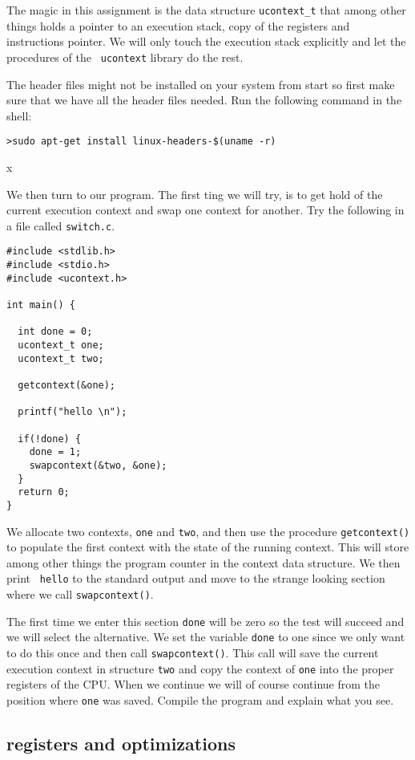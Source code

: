 \documentclass[a4paper,11pt]{article}
\begin{document}
The magic in this assignment is the data structure {\tt ucontext\_t}
that among other things holds a pointer to an execution stack, copy of
the registers and instructions pointer. We will only touch the
execution stack explicitly and let the procedures of the {\tt
  ucontext} library do the rest.

The header files might not be installed on your system from start so
first make sure that we have all the header files needed. Run the
following command in the shell:

\begin {verbatim}
>sudo apt-get install linux-headers-$(uname -r)
\end{verbatim}x

We then turn to our program. The first ting we will try, is to get
hold of the current execution context and swap one context for
another. Try the following in a file called {\tt switch.c}.


\begin{lstlisting}
#include <stdlib.h>
#include <stdio.h>
#include <ucontext.h>

int main() {

  int done = 0;
  ucontext_t one;
  ucontext_t two;

  getcontext(&one);

  printf("hello \n");
  
  if(!done) {
    done = 1;
    swapcontext(&two, &one);
  } 
  return 0;
}
\end{lstlisting}

We allocate two contexts, {\tt one} and {\tt two}, and then use the
procedure {\tt getcontext()} to populate the first context with the
state of the running context. This will store among other things the
program counter in the context data structure. We then print {\tt
  hello} to the standard output and move to the strange looking
section where we call {\tt swapcontext()}. 

The first time we enter this section {\tt done} will be zero so the
test will succeed and we will select the alternative. We set the
variable {\tt done} to one since we only want to do this once and then
call {\tt swapcontext()}. This call will save the current execution
context in structure {\tt two} and copy the context of {\tt one} into
the proper registers of the CPU. When we continue we will of course
continue from the position where {\tt one} was saved. Compile the
program and explain what you see.

\subsection{registers and optimizations}
\end{document}
